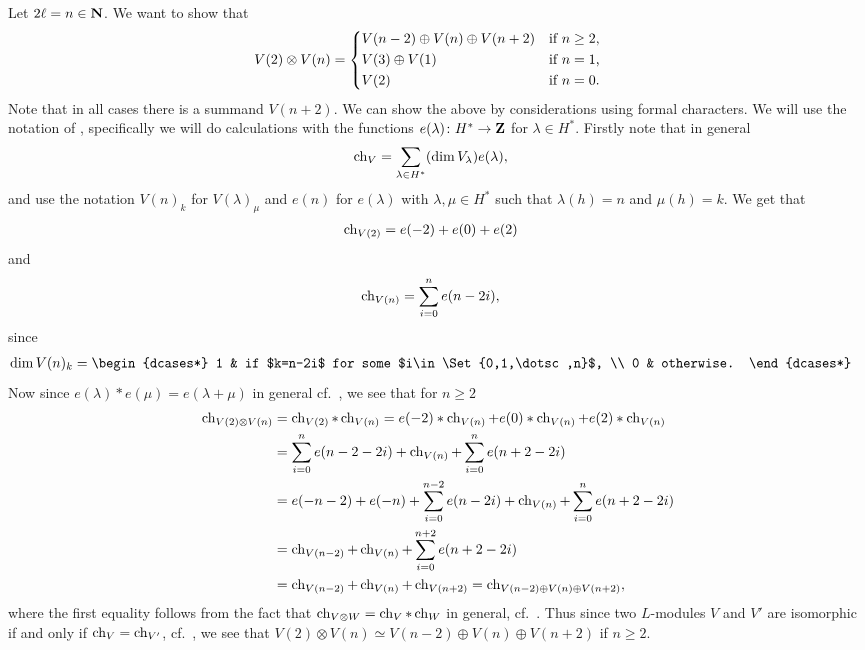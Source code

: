 Let $2\ell=n\in\mathbf{N}$. We want to show that
\begin{align*}
  V(2)\otimes V(n) &=
                     \begin{dcases*}
                       V(n-2) \oplus V(n) \oplus V(n+2) & if $n\geq 2$,\\
                       V(3)\oplus V(1) & if $n=1$, \\
                       V(2) & if $n=0$.
                     \end{dcases*}
\end{align*}
Note that in all cases there is a summand $V(n+2)$. We can show the above by considerations using formal characters. We will use the notation of \cite[Chapter~8]{jantzen}, specifically we will do calculations with the functions $e(\lambda)\colon H^*\to \mathbf{Z}$ for $\lambda\in H^*$. Firstly note that in general
\begin{align*}
  \operatorname{ch}_V &= \sum_{\lambda\in H^*} (\dim V_\lambda) e(\lambda),
\end{align*}
and use the notation $V(n)_k$ for $V(\lambda)_\mu$ and $e(n)$ for $e(\lambda)$ with $\lambda,\mu\in H^*$ such that $\lambda(h)=n$ and $\mu(h)=k$. We get that
\begin{align*}
  \operatorname{ch}_{V(2)} &= e(-2) + e(0) + e(2)
\end{align*}
and 
\begin{align*}
  \operatorname{ch}_{V(n)} &= \sum_{i=0}^n e(n-2i),
\end{align*}
since
\begin{align*}
  \dim V(n)_k &=
                \begin{dcases*}
                  1 & if $k=n-2i$ for some $i\in\Set{0,1,\dotsc,n}$, \\
                  0 & otherwise.
                \end{dcases*}
\end{align*}
Now since $e(\lambda)*e(\mu)=e(\lambda+\mu)$ in general cf.\ \cite[93]{jantzen}, we see that for $n\geq 2$
\begin{align*}
  \operatorname{ch}_{V(2)\otimes V(n)} &= \operatorname{ch}_{V(2)} * \operatorname{ch}_{V(n)} = e(-2)*\operatorname{ch}_{V(n)} + e(0)*\operatorname{ch}_{V(n)} + e(2)*\operatorname{ch}_{V(n)} \\
                         &= \sum_{i=0}^n e(n-2-2i) + \operatorname{ch}_{V(n)} + \sum_{i=0}^n e(n+2-2i) \\
                         &= e(-n-2)+e(-n) + \sum_{i=0}^{n-2} e(n-2i) + \operatorname{ch}_{V(n)} + \sum_{i=0}^n e(n+2-2i) \\
                         &= \operatorname{ch}_{V(n-2)} + \operatorname{ch}_{V(n)} + \sum_{i=0}^{n+2} e(n+2-2i) \\
  &= \operatorname{ch}_{V(n-2)} + \operatorname{ch}_{V(n)} + \operatorname{ch}_{V(n+2)} = \operatorname{ch}_{V(n-2)\oplus V(n)\oplus V(n+2)},
\end{align*}
where the first equality follows from the fact that $\operatorname{ch}_{V\otimes W}=\operatorname{ch}_V * \operatorname{ch}_W$ in general, cf.\ \cite[125]{humphrey}. Thus since two $L$-modules $V$ and $V'$ are isomorphic if and only if $\operatorname{ch}_V=\operatorname{ch}_{V'}$, cf.\ \cite[90]{jantzen}, we see that $V(2)\otimes V(n) \simeq V(n-2)\oplus V(n)\oplus V(n+2)$ if $n\geq 2$.

